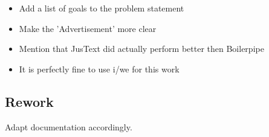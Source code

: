 \begin{itemize}
\item Add a list of goals to the problem statement
\item Make the 'Advertisement' more clear
\item Mention that JusText did actually perform better then Boilerpipe
\item It is perfectly fine to use i/we for this work
\end{itemize}

\subsection{Rework}

Adapt documentation accordingly.










